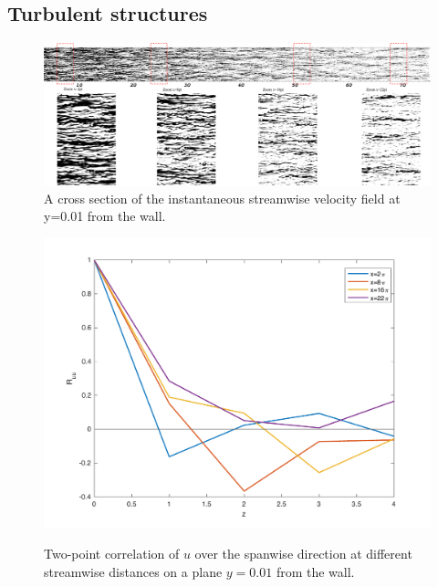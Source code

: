 \documentclass[twocolumn,10pt]{asme2e}
\begin{document}
\subsection*{Turbulent structures}

\begin{figure}[t]
	\includegraphics[width=\textwidth]{streaks.pdf}
	\caption{A cross section of the instantaneous streamwise velocity field at y=0.01  from the wall.}
	\label{fig:streaks}
\end{figure}

\begin{figure}[t]
\centering
\scalebox{0.5}
{\includegraphics{spanwise_correlation.pdf}}
\caption{Two-point correlation of \(u\) over the spanwise direction at different streamwise distances on a plane \(y=0.01\) from the wall.}
\label{fig:spanwise_correlation}
\end{figure}
\end{document}
